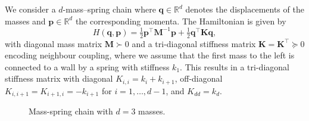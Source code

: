 \documentclass[11pt, a4paper]{article}
\theoremstyle{plain}
\theoremstyle{definition}
\theoremstyle{remark}
\begin{document}
We consider a $d$-mass--spring chain where $\mathbf{q} \in \mathbb R^{d}$ denotes the displacements of the masses and $\mathbf{p} \in \mathbb R^{d}$ the corresponding momenta. The Hamiltonian is given by
\[
H(\mathbf{q},\mathbf{p})=\tfrac12 \mathbf{p}^\top \mathbf{M}^{-1}\mathbf{p}+\tfrac12 \mathbf{q}^\top \mathbf{K}\mathbf{q},
\] 
with diagonal mass matrix $\mathbf{M} \succ 0$ and a tri-diagonal stiffness matrix $\mathbf{K}=\mathbf{K}^\top\succeq 0$ encoding neighbour coupling, where we assume that the first mass to the left is connected to a wall by a spring with stiffness $k_1$. This results in a tri-diagonal stiffness matrix with diagonal $K_{i,i} = k_i + k_{i+1}$, off-diagonal  $K_{i,i+1} = K_{i+1,i} = -k_{i+1}$ for $i = 1,\dots,d-1$, and $K_{dd} = k_d$.
\begin{figure}
\caption{Mass-spring chain with $d=3$ masses.}
\label{fig:mass_spring_damper}
\end{figure}
\end{document}
